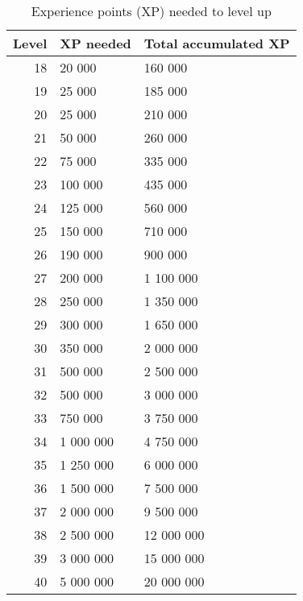 \begin{table}[h]
	\centering
	\begin{tabular}{|r|l|l|}
		\hline
		\textbf{Level} & \textbf{XP needed} & \textbf{Total accumulated XP}\\\hline\hline
		18 & 20 000 & 160 000\\\hline
		19 & 25 000 & 185 000\\\hline
		20 & 25 000 & 210 000\\\hline
		21 & 50 000 & 260 000\\\hline
		22 & 75 000 & 335 000\\\hline
		23 & 100 000 & 435 000\\\hline
		24 & 125 000 & 560 000\\\hline
		25 & 150 000 & 710 000\\\hline
		26 & 190 000 & 900 000\\\hline
		27 & 200 000 & 1 100 000\\\hline
		28 & 250 000 & 1 350 000\\\hline
		29 & 300 000 & 1 650 000\\\hline
		30 & 350 000 & 2 000 000\\\hline
		31 & 500 000 & 2 500 000\\\hline
		32 & 500 000 & 3 000 000\\\hline
		33 & 750 000 & 3 750 000\\\hline
		34 & 1 000 000 & 4 750 000\\\hline
		35 & 1 250 000 & 6 000 000\\\hline
		36 & 1 500 000 & 7 500 000\\\hline
		37 & 2 000 000 & 9 500 000\\\hline
		38 & 2 500 000 & 12 000 000\\\hline
		39 & 3 000 000 & 15 000 000\\\hline
		40 & 5 000 000 & 20 000 000\\\hline
	\end{tabular}
	\caption{Experience points (XP) needed to level up}
	\label{tbl:experience-per-level}
\end{table}


